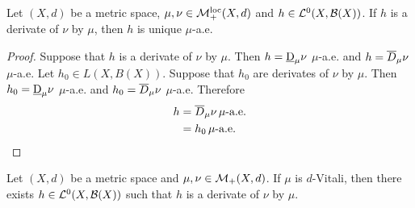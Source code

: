\documentclass{book}
\begin{document}
	\begin{ex} 
	Let $(X, d)$ be a metric space, $\mu, \nu \in \mathcal{M}_+^{\text{loc}}(X, d)$ and $h \in \mathcal{L}^0(X, \mathcal{B}(X))$. If $h$ is a derivate of $\nu$ by $\mu$, then $h$ is unique $\mu$-a.e.
	\end{ex}
	
	\begin{proof}
		Suppose that $h$ is a derivate of $\nu$ by $\mu$. Then $h = \underbar{D}_{\mu}\nu$ $\mu$-a.e. and $h = \overline{D}_{\mu}\nu$ $\mu$-a.e. Let $h_0 \in L(X, B(X))$. Suppose that $h_0$ are derivates of $\nu$ by $\mu$. Then $h_0 = \underbar{D}_{\mu}\nu$ $\mu$-a.e. and $h_0 = \overline{D}_{\mu}\nu$ $\mu$-a.e. Therefore
		\begin{align*}
			h
			& = \overline{D}_{\mu}\nu \, \mu \text{-a.e.} \\
			& = h_0 \, \mu \text{-a.e.}
		\end{align*}
	\end{proof}
	
	\begin{ex} 
		Let $(X, d)$ be a metric space and $\mu, \nu \in \mathcal{M}_+(X, d)$. If $\mu$ is $d$-Vitali, then there exists $h \in \mathcal{L}^0(X, \mathcal{B}(X))$ such that $h$ is a derivate of $\nu$ by $\mu$.
	\end{ex}
\end{document}
